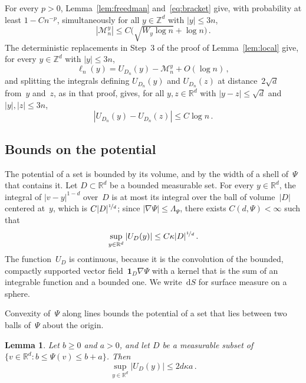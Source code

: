 \documentclass[11pt]{amsart}
\theoremstyle{plain}
\newtheorem{lemma}[theorem]{Lemma}
\theoremstyle{definition}
\newcommand{\Z}{\mathbb Z}
\newcommand{\R}{\mathbb R}
\newcommand{\drift}{\kappa}
\newcommand{\gauge}{\Psi}
\newcommand{\ind}{\mathbf 1}
\newcommand{\dd}{\,\mathrm d}
\newcommand{\nf}{\nicefrac}
\numberwithin{equation}{section}
\begin{document}
For every $p>0$, Lemma~\ref{lem:freedman} and~\eqref{eq:bracket} give, with probability at least $1-Cn^{-p}$, simultaneously for all $y\in\Z^d$ with $|y|\leq3n$,
\begin{equation}\label{eq:localmart}
|\mathcal M_n^y|\leq C\bigl(\sqrt{W_y\log n}+\log n\bigr)\, .
\end{equation}
The deterministic replacements in Step~3 of the proof of Lemma~\ref{lem:local} give, for every $y\in\Z^d$ with $|y|\leq3n$,
\begin{equation}\label{eq:pointwise}
\ell_n(y)=U_{D_n}(y)-\mathcal M_n^y+O(\log n)\, ,
\end{equation}
and splitting the integrals defining $U_{D_n}(y)$ and $U_{D_n}(z)$ at distance~$2\sqrt d$ from~$y$ and~$z$, as in that proof, gives, for all $y,z\in\R^d$ with $|y-z|\leq\sqrt d$ and $|y|,|z|\leq3n$,
\begin{equation}\label{eq:cellmodulus}
|U_{D_n}(y)-U_{D_n}(z)|\leq C\log n\, .
\end{equation}

\subsection{Bounds on the potential}\label{sec:potential-bounds}

The potential of a set is bounded by its volume, and by the width of a shell of~$\gauge$ that contains it. Let $D\subset\R^d$ be a bounded measurable set. For every $y\in\R^d$, the integral of $|v-y|^{1-d}$ over~$D$ is at most its integral over the ball of volume~$|D|$ centered at~$y$, which is $C|D|^{\nf{1}{d}}$; since $|\nabla \gauge|\leq\Lambda_\gauge$, there exists $C(d,\gauge)<\infty$ such that
\begin{equation}\label{eq:potential-bound}
\sup_{y\in\R^d}|U_D(y)|\leq C\drift|D|^{\nf{1}{d}}\, .
\end{equation}
The function~$U_D$ is continuous, because it is the convolution of the bounded, compactly supported vector field~$\ind_D\nabla\gauge$ with a kernel that is the sum of an integrable function and a bounded one. We write $\dd S$ for surface measure on a sphere.

Convexity of~$\gauge$ along lines bounds the potential of a set that lies between two balls of~$\gauge$ about the origin.

\begin{lemma}\label{lem:layer}
Let $b\geq0$ and $a>0$, and let $D$ be a measurable subset of $\{v\in\R^d:b\leq \gauge(v)\leq b+a\}$. Then
\begin{equation*}
\sup_{y\in\R^d}|U_D(y)|\leq2d\drift a\, .
\end{equation*}
\end{lemma}
\end{document}
